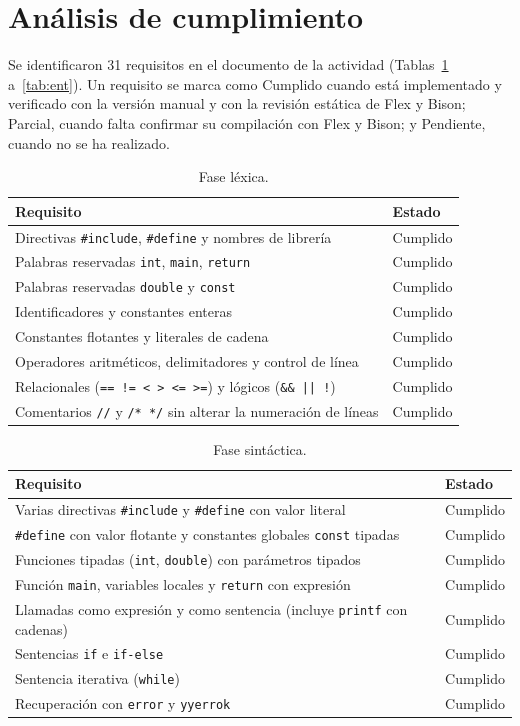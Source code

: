 \documentclass[runningheads]{llncs}
\begin{document}
\section{Análisis de cumplimiento}
Se identificaron 31 requisitos en el documento de la actividad (Tablas~\ref{tab:lex} a~\ref{tab:ent}). Un requisito se marca como Cumplido cuando está implementado y verificado con la versión manual y con la revisión estática de Flex y Bison; Parcial, cuando falta confirmar su compilación con Flex y Bison; y Pendiente, cuando no se ha realizado.

\begin{table}[t]
\caption{Fase léxica.}\label{tab:lex}
\centering\footnotesize
\begin{tabular}{@{}p{85mm}l@{}}
\toprule
Requisito & Estado\\
\midrule
Directivas \texttt{\#include}, \texttt{\#define} y nombres de librería & Cumplido\\
Palabras reservadas \texttt{int}, \texttt{main}, \texttt{return} & Cumplido\\
Palabras reservadas \texttt{double} y \texttt{const} & Cumplido\\
Identificadores y constantes enteras & Cumplido\\
Constantes flotantes y literales de cadena & Cumplido\\
Operadores aritméticos, delimitadores y control de línea & Cumplido\\
Relacionales (\texttt{== != < > <= >=}) y lógicos (\texttt{\&\& || !}) & Cumplido\\
Comentarios \texttt{//} y \texttt{/* */} sin alterar la numeración de líneas & Cumplido\\
\bottomrule
\end{tabular}
\end{table}

\begin{table}[t]
\caption{Fase sintáctica.}\label{tab:sin}
\centering\footnotesize
\begin{tabular}{@{}p{85mm}l@{}}
\toprule
Requisito & Estado\\
\midrule
Varias directivas \texttt{\#include} y \texttt{\#define} con valor literal & Cumplido\\
\texttt{\#define} con valor flotante y constantes globales \texttt{const} tipadas & Cumplido\\
Funciones tipadas (\texttt{int}, \texttt{double}) con parámetros tipados & Cumplido\\
Función \texttt{main}, variables locales y \texttt{return} con expresión & Cumplido\\
Llamadas como expresión y como sentencia (incluye \texttt{printf} con cadenas) & Cumplido\\
Sentencias \texttt{if} e \texttt{if-else} & Cumplido\\
Sentencia iterativa (\texttt{while}) & Cumplido\\
Recuperación con \texttt{error} y \texttt{yyerrok} & Cumplido\\
\bottomrule
\end{tabular}
\end{table}
\end{document}
